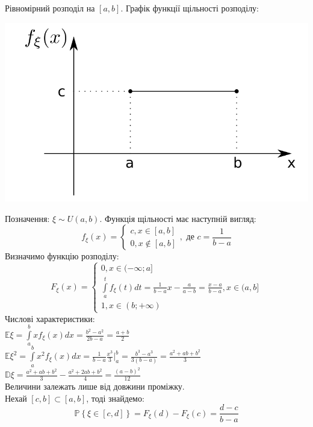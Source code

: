 \documentclass[fontsize=14pt,a4paper]{scrartcl}
\theoremstyle{definition}
\theoremstyle{remark}
\theoremstyle{definition}
\theoremstyle{definition}
\begin{document}
Рівномірний розподіл на $[a,b]$. Графік функції щільності розподілу:\\
\begin{center} \includegraphics[scale=0.3]{images/2.png} \end{center}
Позначення: $\xi \sim U(a,b)$. Функція щільності має наступній вигляд:\\
$$
f_\xi (x) = \left\lbrace \begin{gathered}
 c, x \in [a,b] \\
 0, x \notin [a,b]
 \end{gathered} \right. , \text{ де } c = \frac{1}{b-a}
$$
Визначимо функцію розподілу: $$F_\xi (x) = \left\lbrace
\begin{gathered}
0, x \in (-\infty; a]\\
	\int\limits_{a}^{ t}{f_\xi (t) dt} = \frac{1}{b-a} x - \frac{a}{a-b}  = \frac{x-a}{b-a}, x \in (a,b] \\
1, x \in (b; + \infty)
\end{gathered} \right.   $$
Числові характеристики:\\
$ \mathbb{E} \xi  =   \int\limits_{a}^{ b}{ x  f_\xi (x) dx} = \frac{b^2 - a^2}{2b - a}  = \frac{a+b}{2} $ \\
$ \mathbb{E} \xi^2 =  \int\limits_{a}^{ b}{x^2 f_\xi (x) dx} = \frac{1}{b-a} \frac{x^3}{3} \Big|_a^b = \frac{b^3 - a^3}{3(b-a)} = \frac{a^2 + ab + b^2}{3}   $\\
$ \mathbb{D} \xi =  \frac{a^2 + ab + b^2}{3} - \frac{a^2 + 2ab + b^2}{ 4} = \frac{(a-b)^2}{12}  $\\
Величини залежать лише від довжини проміжку.\\ Нехай $[c,b] \subset [a,b]$, тоді знайдемо:
$$
\mathbb{P} \left\lbrace \xi \in [c,d] \right\rbrace = F_\xi(d) - F_\xi (c) = \frac{d-c}{b-a}
$$
\end{document}
